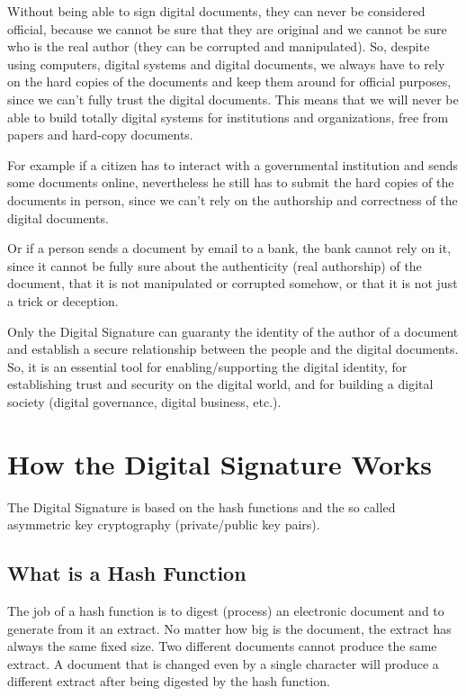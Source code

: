 \documentclass[a4paper]{article}
\begin{document}
Without being able to sign digital documents, they can never be
considered official, because we cannot be sure that they are original
and we cannot be sure who is the real author (they can be corrupted
and manipulated). So, despite using computers, digital systems and
digital documents, we always have to rely on the hard copies of the
documents and keep them around for official purposes, since we can't
fully trust the digital documents. This means that we will never be
able to build totally digital systems for institutions and
organizations, free from papers and hard-copy documents.

For example if a citizen has to interact with a governmental
institution and sends some documents online, nevertheless he still has
to submit the hard copies of the documents in person, since we can't
rely on the authorship and correctness of the digital documents.

Or if a person sends a document by email to a bank, the bank cannot
rely on it, since it cannot be fully sure about the authenticity (real
authorship) of the document, that it is not manipulated or corrupted
somehow, or that it is not just a trick or deception.

Only the Digital Signature can guaranty the identity of the author of
a document and establish a secure relationship between the people and
the digital documents. So, it is an essential tool for
enabling/supporting the digital identity, for establishing trust and
security on the digital world, and for building a digital society
(digital governance, digital business, etc.).


\section{How the Digital Signature Works}

The Digital Signature is based on the hash functions and the so called
asymmetric key cryptography (private/public key pairs).

\subsection{What is a Hash Function}

The job of a hash function is to digest (process) an electronic
document and to generate from it an extract. No matter how big is the
document, the extract has always the same fixed size. Two different
documents cannot produce the same extract. A document that is changed
even by a single character will produce a different extract after
being digested by the hash function.
\end{document}
